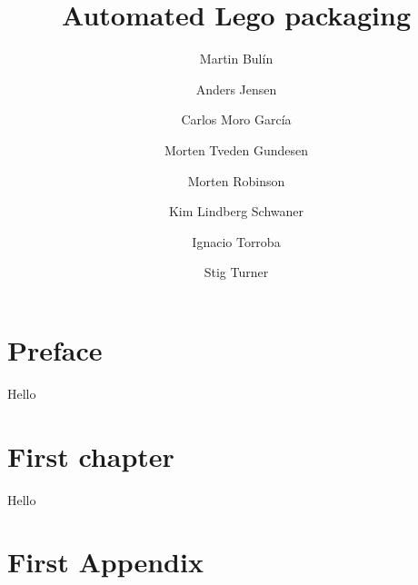 \documentclass{book}
\title{Automated Lego packaging}
\author{Martin Bulín}
\author{Anders Jensen}
\author{Carlos Moro García}
\author{Morten Tveden Gundesen}
\author{Morten Robinson}
\author{Kim Lindberg Schwaner}
\author{Ignacio Torroba}
\author{Stig Turner}
\affil{Faculty of Engineering\\University of Southern Denmark}
\begin{document}
\frontmatter
\maketitle
\tableofcontents
\listoftables
\listoffigures

\chapter{Preface}
Hello

\mainmatter
\chapter{First chapter}
Hello


\appendix
\chapter{First Appendix}


\backmatter
\printbibliography[heading=bibintoc]
\end{document}

